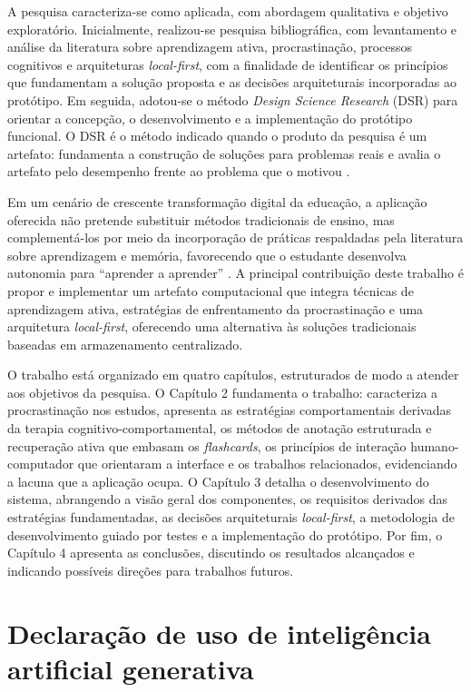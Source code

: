 \documentclass[12pt, %
openright, 
oneside,
a4paper,
english,   %
brazil]{facom-ufu-abntex2}
\begin{document}
A pesquisa caracteriza-se como aplicada, com abordagem qualitativa e objetivo exploratório. Inicialmente, realizou-se pesquisa bibliográfica, com levantamento e análise da literatura sobre aprendizagem ativa, procrastinação, processos cognitivos e arquiteturas \textit{local-first}, com a finalidade de identificar os princípios que fundamentam a solução proposta e as decisões arquiteturais incorporadas ao protótipo. Em seguida, adotou-se o método \textit{Design Science Research} (DSR) para orientar a concepção, o desenvolvimento e a implementação do protótipo funcional. O DSR é o método indicado quando o produto da pesquisa é um artefato: fundamenta a construção de soluções para problemas reais e avalia o artefato pelo desempenho frente ao problema que o motivou \cite{Dresch2015}.

Em um cenário de crescente transformação digital da educação, a aplicação oferecida não pretende substituir métodos tradicionais de ensino, mas complementá-los por meio da incorporação de práticas respaldadas pela literatura sobre aprendizagem e memória, favorecendo que o estudante desenvolva autonomia para ``aprender a aprender'' \cite{EducationAppDevelopmentNeedsTpBeInformedByNeuroscience}. A principal contribuição deste trabalho é propor e implementar um artefato computacional que integra técnicas de aprendizagem ativa, estratégias de enfrentamento da procrastinação e uma arquitetura \textit{local-first}, oferecendo uma alternativa às soluções tradicionais baseadas em armazenamento centralizado.

O trabalho está organizado em quatro capítulos, estruturados de modo a atender aos objetivos da pesquisa. O Capítulo 2 fundamenta o trabalho: caracteriza a procrastinação nos estudos, apresenta as estratégias comportamentais derivadas da terapia cognitivo-comportamental, os métodos de anotação estruturada e recuperação ativa que embasam os \textit{flashcards}, os princípios de interação humano-computador que orientaram a interface e os trabalhos relacionados, evidenciando a lacuna que a aplicação ocupa. O Capítulo 3 detalha o desenvolvimento do sistema, abrangendo a visão geral dos componentes, os requisitos derivados das estratégias fundamentadas, as decisões arquiteturais \textit{local-first}, a metodologia de desenvolvimento guiado por testes e a implementação do protótipo. Por fim, o Capítulo 4 apresenta as conclusões, discutindo os resultados alcançados e indicando possíveis direções para trabalhos futuros.

\section{Declaração de uso de inteligência artificial generativa}
\label{sec:declaracao-ia}
\end{document}
